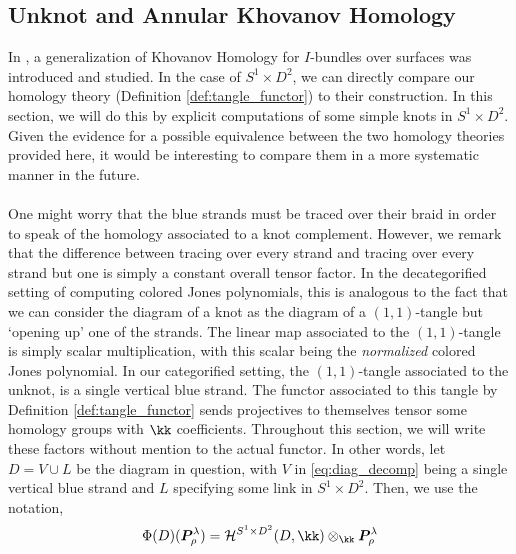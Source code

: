 \documentclass{article}
\begin{document}
\subsection{Unknot and Annular Khovanov Homology}\label{sec:AKh}
In \cite{APS}, a generalization of Khovanov Homology for $I$-bundles over surfaces was introduced and studied. In the case of $S^1 \times D^2$, we can directly compare our homology theory (Definition \ref{def:tangle_functor}) to their construction. In this section, we will do this by explicit computations of some simple knots in $S^1\times D^2$. Given the evidence for a possible equivalence between the two homology theories provided here, it would be interesting to compare them in a more systematic manner in the future. \\ \\
One might worry that the blue strands must be traced over their braid in order to speak of the homology associated to a knot complement. However, we remark that the difference between tracing over every strand and tracing over every strand but one is simply a constant overall tensor factor. In the decategorified setting of computing colored Jones polynomials, this is analogous to the fact that we can consider the diagram of a knot as the diagram of a $(1,1)$-tangle but `opening up' one of the strands. The linear map associated to the $(1,1)$-tangle is simply scalar multiplication, with this scalar being the \textit{normalized} colored Jones polynomial. In our categorified setting, the $(1,1)$-tangle associated to the unknot, is a single vertical blue strand. The functor associated to this tangle by Definition \ref{def:tangle_functor} sends projectives to themselves tensor some homology groups with $\kk$ coefficients. Throughout this section, we will write these factors without mention to the actual functor. In other words, let $D=V\cup L$ be the diagram in question, with $V$ in \eqref{eq:diag_decomp} being a single vertical blue strand and $L$ specifying some link in $S^1 \times D^2$. Then, we use the notation, 
$$\Phi(D)(\Pb^\lambda_{\rho}) = \mathcal{H}^{S^1\times D^2}(D,\kk) \otimes_\kk\Pb^\lambda_{\rho}$$
\end{document}
